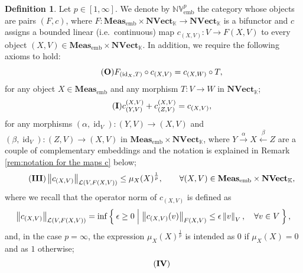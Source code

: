 \documentclass{amsart}
\theoremstyle{definition}
\newtheorem{definition}{Definition}[section]
\theoremstyle{plain}
\newcommand{\norm}[1]{\left\lVert #1\right\rVert} %
\newcommand{\id}{\operatorname{id}}
\newcommand{\embMeas}{\mathbf{Meas}_\mathrm{emb}}
\newcommand{\NVect}{\mathbf{NVect}_{\mathbb{K}}}
\newcommand{\NVembp}{\mathbb{NV}_{\mathrm{emb}}^p}
\begin{document}
        \begin{definition}
        \label{def:NV_embp}
            Let $p \in [1,\infty]$. 
            We denote by $\NVembp$ the category whose objects are pairs $(F,c)$, where $F \colon \embMeas \times \NVect \rightarrow \NVect$ is a bifunctor and $c$ assigns a bounded linear (i.e.~continuous) map $c_{(X,V)} \colon V \rightarrow F(X,V)$ to every object $(X,V) \in \embMeas \times \NVect$. 
            In addition, we require the following axioms to hold:
            \begin{equation}
            \tag{\textbf{O}}
            \label{ax:compatibility with linear contractive maps}
                F_{(\id_X,T)} \circ c_{(X,V)} = c_{(X,W)} \circ T,
            \end{equation}            
            for any object $X \in \embMeas$ and any morphism $T \colon V \rightarrow W$ in $\NVect$;
            \begin{equation}
            \tag{\textbf{I}}
            \label{ax:compatibility with complementary embeddings in the normed case}
                c_{(Y,V)}^{(X,V)} + c_{(Z,V)}^{(X,V)} = c_{(X,V)},
            \end{equation}
            for any morphisms $(\alpha,\id_V) \colon (Y,V) \rightarrow (X,V)$ and $(\beta,\id_V) \colon (Z,V) \rightarrow (X,V)$ in $\embMeas \times \NVect$, where $Y \xrightarrow{~\alpha~} X \xleftarrow{~\beta~} Z$ are a couple of complementary embeddings and the notation is explained in Remark \ref{rem:notation for the maps c} below;
            \begin{equation} 
            \tag{\textbf{III}}
            \label{ax:boundedness of c}
                \norm{c_{(X,V)}}_{\mathcal{L}(V,F(X,V))} \leq \mu_X(X)^{\frac{1}{p}}, \qquad \forall (X,V) \in \embMeas \times \NVect, 
            \end{equation}
            where we recall that the operator norm of $c_{(X,V)}$ is defined as
            \begin{equation*}
                \norm{c_{(X,V)}}_{\mathcal{L}(V,F(X,V))} = \inf \Set{\epsilon \geq 0 | \norm{c_{(X,V)}(v)}_{F(X,V)} \leq \epsilon \norm{v}_V, \quad \forall v \in V},
            \end{equation*}
            and, in the case $p = \infty$, the expression $\mu_X(X)^{\frac{1}{p}}$ is intended as $0$ if $\mu_X(X) = 0$ and as $1$ otherwise;
            \begin{equation}
            \tag{\textbf{IV}}
            \label{ax:norm inequality wrt complementary embeddings}

\end{equation}
\end{definition}
\end{document}
